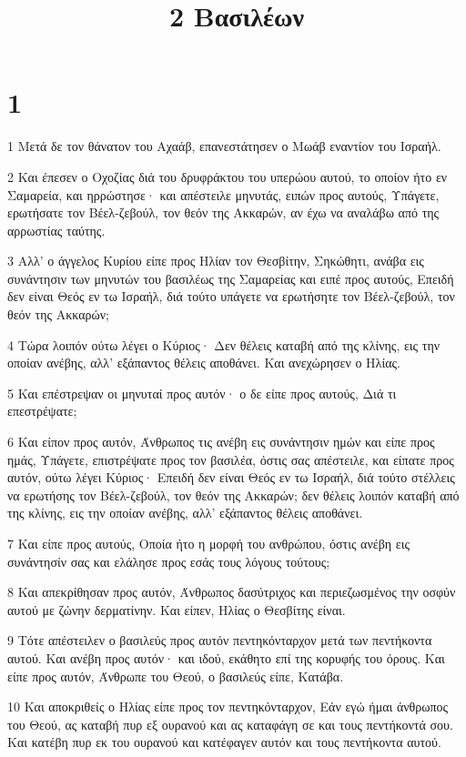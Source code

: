 

\title{2 Βασιλέων}


\chapter{1}

\par 1 Μετά δε τον θάνατον του Αχαάβ, επανεστάτησεν ο Μωάβ εναντίον του Ισραήλ.
\par 2 Και έπεσεν ο Οχοζίας διά του δρυφράκτου του υπερώου αυτού, το οποίον ήτο εν Σαμαρεία, και ηρρώστησε· και απέστειλε μηνυτάς, ειπών προς αυτούς, Υπάγετε, ερωτήσατε τον Βέελ-ζεβούλ, τον θεόν της Ακκαρών, αν έχω να αναλάβω από της αρρωστίας ταύτης.
\par 3 Αλλ' ο άγγελος Κυρίου είπε προς Ηλίαν τον Θεσβίτην, Σηκώθητι, ανάβα εις συνάντησιν των μηνυτών του βασιλέως της Σαμαρείας και ειπέ προς αυτούς, Επειδή δεν είναι Θεός εν τω Ισραήλ, διά τούτο υπάγετε να ερωτήσητε τον Βέελ-ζεβούλ, τον θεόν της Ακκαρών;
\par 4 Τώρα λοιπόν ούτω λέγει ο Κύριος· Δεν θέλεις καταβή από της κλίνης, εις την οποίαν ανέβης, αλλ' εξάπαντος θέλεις αποθάνει. Και ανεχώρησεν ο Ηλίας.
\par 5 Και επέστρεψαν οι μηνυταί προς αυτόν· ο δε είπε προς αυτούς, Διά τι επεστρέψατε;
\par 6 Και είπον προς αυτόν, Άνθρωπος τις ανέβη εις συνάντησιν ημών και είπε προς ημάς, Υπάγετε, επιστρέψατε προς τον βασιλέα, όστις σας απέστειλε, και είπατε προς αυτόν, ούτω λέγει Κύριος· Επειδή δεν είναι Θεός εν τω Ισραήλ, διά τούτο στέλλεις να ερωτήσης τον Βέελ-ζεβούλ, τον θεόν της Ακκαρών; δεν θέλεις λοιπόν καταβή από της κλίνης, εις την οποίαν ανέβης, αλλ' εξάπαντος θέλεις αποθάνει.
\par 7 Και είπε προς αυτούς, Οποία ήτο η μορφή του ανθρώπου, όστις ανέβη εις συνάντησίν σας και ελάλησε προς εσάς τους λόγους τούτους;
\par 8 Και απεκρίθησαν προς αυτόν, Άνθρωπος δασύτριχος και περιεζωσμένος την οσφύν αυτού με ζώνην δερματίνην. Και είπεν, Ηλίας ο Θεσβίτης είναι.
\par 9 Τότε απέστειλεν ο βασιλεύς προς αυτόν πεντηκόνταρχον μετά των πεντήκοντα αυτού. Και ανέβη προς αυτόν· και ιδού, εκάθητο επί της κορυφής του όρους. Και είπε προς αυτόν, Άνθρωπε του Θεού, ο βασιλεύς είπε, Κατάβα.
\par 10 Και αποκριθείς ο Ηλίας είπε προς τον πεντηκόνταρχον, Εάν εγώ ήμαι άνθρωπος του Θεού, ας καταβή πυρ εξ ουρανού και ας καταφάγη σε και τους πεντήκοντά σου. Και κατέβη πυρ εκ του ουρανού και κατέφαγεν αυτόν και τους πεντήκοντα αυτού.
